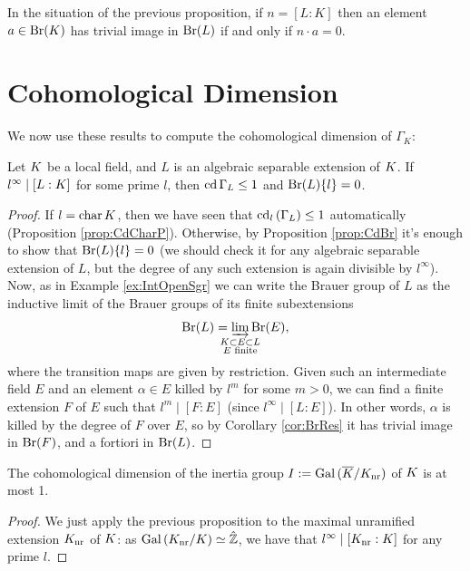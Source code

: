 \documentclass[a4paper, oneside]{memoir}
\begin{document}
\begin{corollary}\label{cor:BrRes}
    In the situation of the previous proposition, if $n=[L:K]$ then an element $a\in\mathrm{Br}(K)$ has trivial image in $\mathrm{Br}(L)$ if and only if $n\cdot a=0$.
\end{corollary}

\section{Cohomological Dimension}

We now use these results to compute the cohomological dimension of $\Gamma_K$:

\begin{proposition}
    Let $K$ be a local field, and $L$ is an algebraic separable extension of $K$. If $l^\infty \mid [L:K]$ for some prime $l$, then $\operatorname{cd}{\Gamma_L}\leq 1$ and $\mathrm{Br}(L)\{l\}=0$.
\end{proposition}

\begin{proof}
    If $l = \operatorname{char}{K}$, then we have seen that $\operatorname{cd}_l{(\Gamma_L)}\leq 1$ automatically (Proposition \ref{prop:CdCharP}).
    Otherwise, by Proposition \ref{prop:CdBr} it's enough to show that $\mathrm{Br}(L)\{l\}=0$ (we should check it for any algebraic separable extension of $L$, but the degree of any such
    extension is again divisible by $l^\infty$).
    Now, as in Example \ref{ex:IntOpenSgr} we can write the Brauer group of $L$ as the inductive limit of the Brauer groups of its finite subextensions
    \[
        \Br{L}=\varinjlim_{\mathclap{\substack{\K\subset E\subset L \\ E\text{ finite}}}}{\Br{E}},
    \]
    where the transition maps are given by restriction.
    Given such an intermediate field $E$ and an element $\alpha\in E$ killed by $l^m$ for some $m>0$, we can find a finite extension $F$ of $E$ such that $l^m\mid [F:E]$ (since
    $l^\infty\mid [L:E]$). In other words, $\alpha$ is killed by the degree of $F$ over $E$, so by Corollary \ref{cor:BrRes} it has trivial image in $\mathrm{Br}(F)$, and a fortiori in $\mathrm{Br}(L)$.

\end{proof}

\begin{corollary}
    The cohomological dimension of the inertia group $I:=\operatorname{Gal}{(\overline{K}/K_{\text{nr}})}$ of $K$ is at most 1.
\end{corollary}

\begin{proof}
    We just apply the previous proposition to the maximal unramified extension $K_{\text{nr}}$ of $K$: as $\operatorname{Gal}{(K_{\text{nr}}/K)}\simeq\hat{\mathbb{Z}}$, we have that
    $l^\infty\mid [K_{\text{nr}}:K]$ for any prime $l$.
\end{proof}
\end{document}
